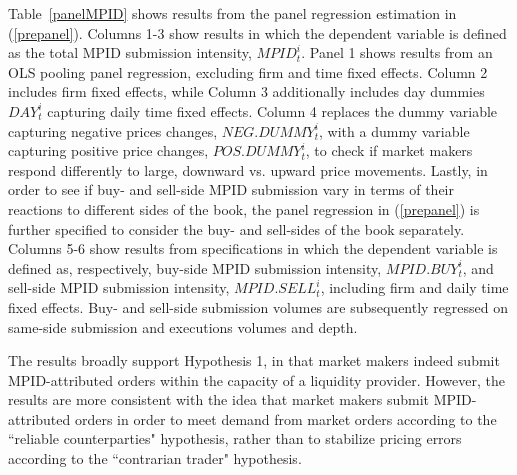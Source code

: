 \documentclass{article}
\begin{document}
Table~\ref{panelMPID} shows results from the panel regression estimation in (\ref{prepanel}). Columns 1-3 show results in which the dependent variable is defined as the total MPID submission intensity, $MPID_t^i$. Panel 1 shows results from an OLS pooling panel regression, excluding firm and time fixed effects. Column 2 includes firm fixed effects, while Column 3 additionally includes day dummies $DAY_t^i$ capturing daily time fixed effects. Column 4 replaces the dummy variable capturing negative prices changes, $NEG.DUMMY_t^i$, with a dummy variable capturing positive price changes, $POS.DUMMY_t^i$, to check if market makers respond differently to large, downward vs. upward price movements. Lastly, in order to see if buy- and sell-side MPID submission vary in terms of their reactions to different sides of the book, the panel regression in (\ref{prepanel}) is further specified to consider the buy- and sell-sides of the book separately. Columns 5-6 show results from specifications in which the dependent variable is defined as, respectively, buy-side MPID submission intensity, $MPID.BUY_t^i$, and sell-side MPID submission intensity, $MPID.SELL_t^i$, including firm and daily time fixed effects. Buy- and sell-side submission volumes are subsequently regressed on same-side submission and executions volumes and depth.

The results broadly support Hypothesis 1, in that market makers indeed submit MPID-attributed orders within the capacity of a liquidity provider. However, the results are more consistent with the idea that market makers submit MPID-attributed orders in order to meet demand from market orders according to the ``reliable counterparties" hypothesis, rather than to stabilize pricing errors according to the ``contrarian trader" hypothesis.
\end{document}
